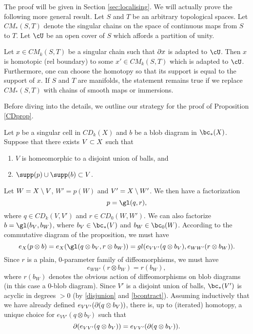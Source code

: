 The proof will be given in Section \ref{sec:localising}.
We will actually prove the following more general result.
Let $S$ and $T$ be an arbitrary topological spaces.
Let $CM_*(S, T)$ denote the singular chains on the space of continuous maps
from $S$ to $T$.
Let $\cU$ be an open cover of $S$ which affords a partition of unity.

\begin{lemma}  \label{extension_lemma_b}
Let $x \in CM_k(S, T)$ be a singular chain such that $\partial x$ is adapted to $\cU$.
Then $x$ is homotopic (rel boundary) to some $x' \in CM_k(S, T)$ which is adapted to $\cU$.
Furthermore, one can choose the homotopy so that its support is equal to the support of $x$.
If $S$ and $T$ are manifolds, the statement remains true if we replace $CM_*(S, T)$ with
chains of smooth maps or immersions.
\end{lemma}


\medskip

Before diving into the details, we outline our strategy for the proof of Proposition \ref{CDprop}.

Let $p$ be a singular cell in $CD_k(X)$ and $b$ be a blob diagram in $\bc_*(X)$.
Suppose that there exists $V \subset X$ such that
\begin{enumerate}
\item $V$ is homeomorphic to a disjoint union of balls, and
\item $\supp(p) \cup \supp(b) \sub V$.
\end{enumerate}
Let $W = X \setminus V$, $W' = p(W)$ and $V' = X\setminus W'$.
We then have a factorization 
\[
	p = \gl(q, r),
\]
where $q \in CD_k(V, V')$ and $r \in CD_0(W, W')$.
We can also factorize $b = \gl(b_V, b_W)$, where $b_V\in \bc_*(V)$ and $b_W\in\bc_0(W)$.
According to the commutative diagram of the proposition, we must have
\[
	e_X(p\otimes b) = e_X(\gl(q\otimes b_V, r\otimes b_W)) = 
				gl(e_{VV'}(q\otimes b_V), e_{WW'}(r\otimes b_W)) .
\]
Since $r$ is a plain, 0-parameter family of diffeomorphisms, we must have
\[
	e_{WW'}(r\otimes b_W) = r(b_W),
\]
where $r(b_W)$ denotes the obvious action of diffeomorphisms on blob diagrams (in
this case a 0-blob diagram).
Since $V'$ is a disjoint union of balls, $\bc_*(V')$ is acyclic in degrees $>0$ 
(by \ref{disjunion} and \ref{bcontract}).
Assuming inductively that we have already defined $e_{VV'}(\partial(q\otimes b_V))$,
there is, up to (iterated) homotopy, a unique choice for $e_{VV'}(q\otimes b_V)$
such that 
\[
	\partial(e_{VV'}(q\otimes b_V)) = e_{VV'}(\partial(q\otimes b_V)) .
\]

